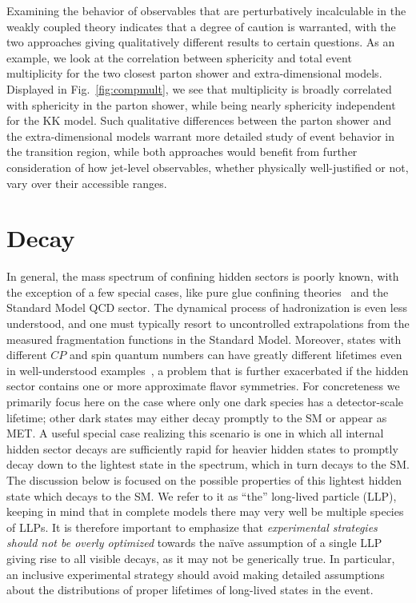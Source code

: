 \begin{enumerate}
Examining the behavior of observables that are perturbatively incalculable in the weakly coupled theory indicates that a degree of caution is warranted, with the two approaches giving qualitatively different results to certain questions. As an example, we look at the correlation between sphericity and total event multiplicity for the two closest parton shower and extra-dimensional models. Displayed in Fig.~\ref{fig:compmult}, we see that multiplicity is broadly correlated with sphericity in the parton shower, while being nearly sphericity independent for the KK model. Such qualitative differences between the parton shower and the extra-dimensional models warrant more detailed study of event behavior in the transition region, while both approaches would benefit from further consideration of how jet-level observables, whether physically well-justified or not, vary over their accessible ranges.

\section{Decay}
\label{sec:darkshowerdk}

In general, the mass spectrum of confining hidden sectors is poorly known, with the exception of a few special cases, like pure glue confining theories~\cite{Morningstar:1999rf} and the Standard Model QCD sector. The dynamical process of hadronization is even less understood, and one must typically resort to uncontrolled extrapolations from the measured fragmentation functions in the Standard Model. Moreover,  states with different $CP$ and spin  quantum numbers  can have greatly different lifetimes even in well-understood examples~\cite{Strassler:2006im,Juknevich:2009ji,Juknevich:2009gg}, a problem that is further exacerbated if the hidden sector contains one or more approximate flavor symmetries. For concreteness we primarily focus here on the case where only one dark species has a detector-scale lifetime; other dark states may either  decay promptly to the SM or appear as MET.
A useful special case realizing this scenario is one in which all internal hidden sector decays are sufficiently rapid for heavier hidden states to promptly decay down to the lightest state in the spectrum, which in turn decays to the SM. The discussion below is focused on the possible properties of this lightest hidden state which decays to the SM. We refer to it as ``the'' long-lived particle (LLP), keeping in mind that in complete models there may very well be multiple species of LLPs. It is therefore important to emphasize that \emph{experimental strategies should not be overly optimized} towards the na\"ive assumption of a single LLP giving rise to all visible decays, as it may not be generically true. In particular, an inclusive experimental strategy should avoid making detailed assumptions about the distributions of proper lifetimes of long-lived states in the event.



\end{enumerate}
